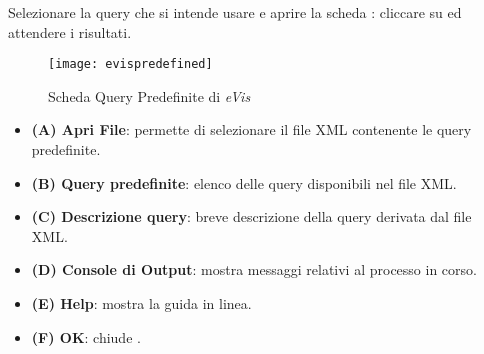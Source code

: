 Selezionare la query che si intende usare e aprire la scheda : cliccare su  
ed attendere i risultati. 

\begin{figure}[htp]
   \centering
   \texttt{[image: evispredefined]}
   \caption{Scheda Query Predefinite di \emph{eVis} \wincaption}\label{evispredefined}
\end{figure}

\begin{itemize}[label=--]
\item \textbf{(A) Apri File}: permette di selezionare il file XML contenente le query predefinite.
\item \textbf{(B) Query predefinite}: elenco delle query disponibili nel file XML.
\item \textbf{(C) Descrizione query}: breve descrizione della query derivata dal file XML.
\item \textbf{(D) Console di Output}: mostra messaggi relativi al processo in corso.
\item \textbf{(E) Help}: mostra la guida in linea.
\item \textbf{(F) OK}: chiude .
\end{itemize}

\label{evis_xml_format}

